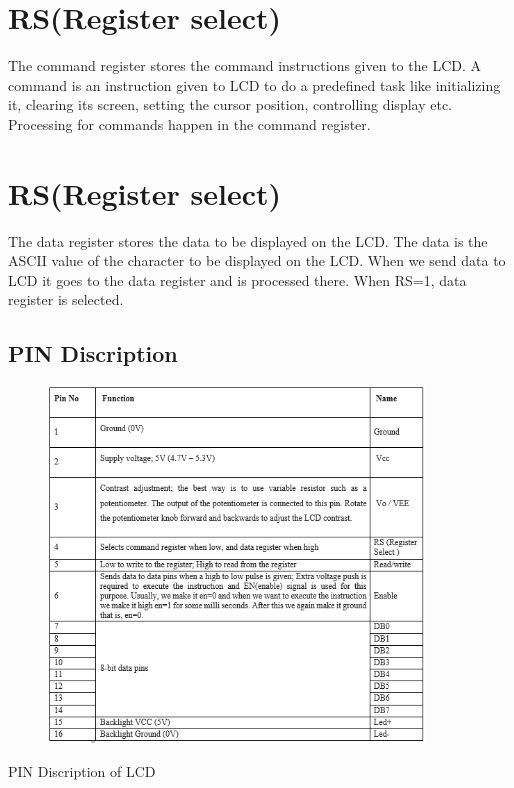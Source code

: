 \documentclass[twoside,a4paper,16pt]{book}
\begin{document}
{\section*{RS(Register select)}
The command register stores the command instructions given to the LCD. A command is an instruction given to LCD to do a predefined task like initializing it, clearing its screen, setting the cursor position, controlling display etc. Processing for commands happen in the command register.
\section*{RS(Register select)}
The data register stores the data to be displayed on the LCD. The data is the ASCII value of the character to be displayed on the LCD. When we send data to LCD it goes to the data register and is processed there. When RS=1, data register is selected.



\newpage
\subsection{PIN Discription}
\begin{figure}[ht!]
	\begin{center}
		\includegraphics[width=10.0cm]{18.png}
	\end{center}
\end{figure}

\begin{table}[!ht]
	
	\caption{PIN Discription of LCD}
\end{table}



}
\end{document}
